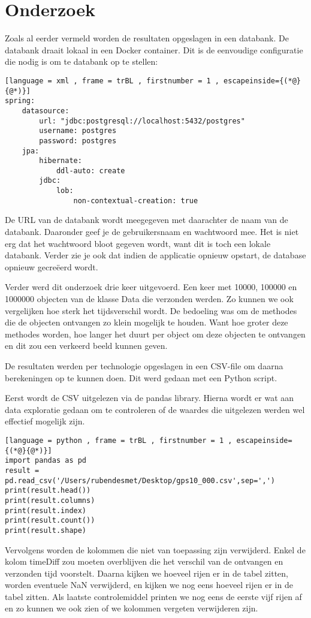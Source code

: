 \section{Onderzoek}
Zoals al eerder vermeld worden de resultaten opgeslagen in een databank. De databank draait lokaal in een Docker container. Dit is de eenvoudige configuratie die nodig is om te databank op te stellen:
\begin{lstlisting}[language = xml , frame = trBL , firstnumber = 1 , escapeinside={(*@}{@*)}]
spring:
    datasource:
        url: "jdbc:postgresql://localhost:5432/postgres"
        username: postgres
        password: postgres
    jpa:
        hibernate:
            ddl-auto: create
        jdbc:
            lob:
                non-contextual-creation: true
\end{lstlisting}
De URL van de databank wordt meegegeven met daarachter de naam van de databank. Daaronder geef je de gebruikersnaam en wachtwoord mee. Het is niet erg dat het wachtwoord bloot gegeven wordt, want dit is toch een lokale databank. Verder zie je ook dat indien de applicatie opnieuw opstart, de database opnieuw gecreëerd wordt.

Verder werd dit onderzoek drie keer uitgevoerd. Een keer met 10000, 100000 en 1000000 objecten van de klasse Data die verzonden werden. Zo kunnen we ook vergelijken hoe sterk het tijdsverschil wordt. De bedoeling was om de methodes die de objecten ontvangen zo klein mogelijk te houden. Want hoe groter deze methodes worden, hoe langer het duurt per object om deze objecten te ontvangen en dit zou een verkeerd beeld kunnen geven.

De resultaten werden per technologie opgeslagen in een CSV-file om daarna berekeningen op te kunnen doen. Dit werd gedaan met een Python script. 

Eerst wordt de CSV uitgelezen via de pandas library. Hierna wordt er wat aan data exploratie gedaan om te controleren of de waardes die uitgelezen werden wel effectief mogelijk zijn. 
\begin{lstlisting}[language = python , frame = trBL , firstnumber = 1 , escapeinside={(*@}{@*)}]
import pandas as pd
result = pd.read_csv('/Users/rubendesmet/Desktop/gps10_000.csv',sep=',')
print(result.head())
print(result.columns)
print(result.index)
print(result.count())
print(result.shape)
\end{lstlisting}

Vervolgens worden de kolommen die niet van toepassing zijn verwijderd. Enkel de kolom timeDiff zou moeten overblijven die het verschil van de ontvangen en verzonden tijd voorstelt. Daarna kijken we hoeveel rijen er in de tabel zitten, worden eventuele NaN verwijderd, en kijken we nog eens hoeveel rijen er in de tabel zitten. Als laatste controlemiddel printen we nog eens de eerste vijf rijen af en zo kunnen we ook zien of we kolommen vergeten verwijderen zijn. 

